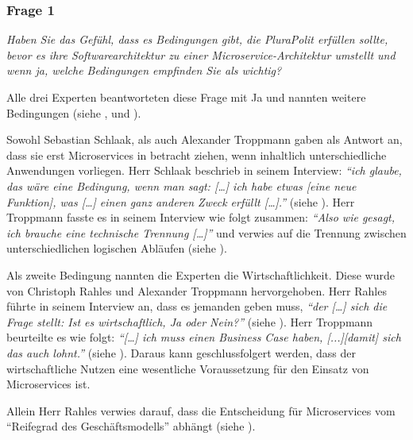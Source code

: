 \subsubsection{Frage 1}
\label{sec:frage1}

\textit{Haben Sie das Gefühl, dass es Bedingungen gibt, die PluraPolit erfüllen sollte, bevor es ihre Softwarearchitektur zu einer Microservice-Architektur umstellt und wenn ja, welche Bedingungen empfinden Sie als wichtig?}

Alle drei Experten beantworteten diese Frage mit Ja und nannten weitere Bedingungen (siehe ,  und ).

Sowohl Sebastian Schlaak, als auch Alexander Troppmann gaben als Antwort an, dass sie erst Microservices in betracht ziehen, wenn inhaltlich unterschiedliche Anwendungen vorliegen. Herr Schlaak beschrieb in seinem Interview: \textit{\enquote{ich glaube, das wäre eine Bedingung, wenn man sagt: […] ich habe etwas [eine neue Funktion], was […] einen ganz anderen Zweck erfüllt […].}} (siehe ). Herr Troppmann fasste es in seinem Interview wie folgt zusammen:  \textit{\enquote{Also wie gesagt, ich brauche eine technische Trennung […]}} und verwies auf die Trennung zwischen unterschiedlichen logischen Abläufen (siehe ).

Als zweite Bedingung nannten die Experten die Wirtschaftlichkeit. Diese wurde  von Christoph Rahles und Alexander Troppmann hervorgehoben. Herr Rahles führte in seinem Interview an, dass es jemanden geben muss, \textit{\enquote{der […] sich die Frage stellt: Ist es wirtschaftlich, Ja oder Nein?}} (siehe ). Herr Troppmann beurteilte es wie folgt: \textit{\enquote{[…] ich muss einen Business Case haben, [...][damit] sich das auch lohnt.}} (siehe ). Daraus kann geschlussfolgert werden, dass der wirtschaftliche Nutzen eine wesentliche Voraussetzung für den Einsatz von Microservices ist.

Allein Herr Rahles verwies darauf, dass die Entscheidung für Microservices vom “Reifegrad des Geschäftsmodells” abhängt (siehe ).
